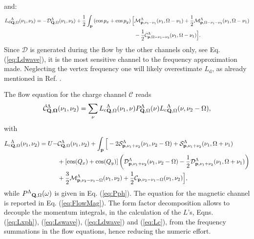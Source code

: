 and: 
\begin{align} 
\label{eq:Ldwave}
{L_\mathrm{d}}^{\Lambda}_{\mathbf{Q},\Omega}(\nu_1,\nu_3) = -\mathcal{D}^{\Lambda}_{\mathbf{Q},\Omega}(\nu_1,\nu_3) 
+ \frac{1}{2}\int_{\mathbf{p}} \left(\cos{p_x}+\cos{p_y}\right) \Big[ 
& \mathcal{M}^{\Lambda}_{\mathbf{p},\nu_3-\nu_1}(\nu_1,\Omega-\nu_1) 
+ \frac{1}{2} \mathcal{M}^{\Lambda}_{\mathbf{p},\Omega-\nu_1-\nu_3}(\nu_1,\Omega-\nu_1) \\
\nonumber
&- \frac{1}{2} \mathcal{C}^{\Lambda}_{\mathbf{p},\Omega-\nu_1-\nu_3}(\nu_1,\Omega-\nu_1) \Big].
\end{align}	 
Since $\mathcal{D}$ is generated during the flow by the other channels only, see Eq. (\ref{eq:Ldwave}), it is the most sensitive channel to the frequency approximation made.  
Neglecting the vertex frequency one will likely overestimate $L_{\mathrm{d}}$, as already mentioned in Ref. .

The flow equation for the charge channel $\mathcal{C}$ reads
\begin{equation}
\dot{\mathcal{C}}^{\Lambda}_{\mathbf{Q,\Omega}}(\nu_1,\nu_2) = \sum_{\nu}{L_\mathrm{c}}^{\Lambda}_{\mathbf{Q},\Omega} (\nu_1,\nu) P^{\Lambda}_{\mathbf{Q},\Omega}(\nu) 
{L_\mathrm{c}}^{\Lambda}_{\mathbf{Q},\Omega} (\nu,\nu_2-\Omega), 
\end{equation} 	   
with
 \begin{align}  
{L_\mathrm{c}}^{\Lambda}_{\mathbf{Q},\Omega}(\nu_1,\nu_2)=U-&\mathcal{C}^{\Lambda}_{\mathbf{Q},\Omega}(\nu_1,\nu_2)
+ \int_{\mathbf{p}} \Big [
- 2 \mathcal{S}^{\Lambda}_{\mathbf{p},\nu_1+\nu_2}(\nu_1,\nu_2-\Omega) + \mathcal{S}^{\Lambda}_{\mathbf{p},\nu_1+\nu_2}(\nu_1,\Omega+\nu_1)
\nonumber
\\ &+  [\cos(Q_x)+\cos(Q_y)]\left( \mathcal{D}^{\Lambda}_{\mathbf{p},\nu_1+\nu_2}(\nu_1,\nu_2-\Omega) -\frac{1}{2} \mathcal{D}^{\Lambda}_{\mathbf{p},\nu_1+\nu_2}(\nu_1,\Omega+\nu_1) \right)
\nonumber \\ &+ \frac{3}{2} \mathcal{M}^{\Lambda}_{\mathbf{p},\nu_2-\nu_1-\Omega}(\nu_1,\nu_2)
+ \frac{1}{2} \mathcal{C}_{\mathbf{p},\nu_2-\nu_1-\Omega}(\nu_1,\nu_2) \Big],
\label{eq:Lc}
\end{align}
while ${P^{\Lambda}}_{\mathbf{Q},\Omega}(\omega)$ is given in Eq. (\ref{eq:Pph}).
The equation for the magnetic channel is reported in Eq. (\ref{eq:FlowMag}).
The form factor decomposition allows to decouple the momentum integrals, in the calculation of the $L$'s, Eqns. (\ref{eq:Lxph}), (\ref{eq:Lswave}), (\ref{eq:Ldwave}) and (\ref{eq:Lc}), from the frequency summations in the flow equations, hence reducing the numeric effort.   	 


